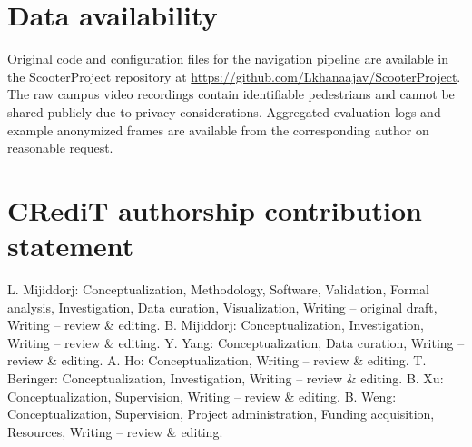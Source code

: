 \documentclass[a4paper,fleqn,10pt]{cas-dc}
\begin{document}
\section*{Data availability}
Original code and configuration files for the navigation pipeline are available in
the ScooterProject repository at
\url{https://github.com/Lkhanaajav/ScooterProject}. The raw campus video
recordings contain identifiable pedestrians and cannot be shared publicly due to
privacy considerations. Aggregated evaluation logs and example anonymized
frames are available from the corresponding author on reasonable request.

\section*{CRediT authorship contribution statement}
L. Mijiddorj: Conceptualization, Methodology, Software, Validation,
Formal analysis, Investigation, Data curation, Visualization,
Writing -- original draft, Writing -- review \& editing.
B. Mijiddorj: Conceptualization, Investigation, Writing -- review \& editing.
Y. Yang: Conceptualization, Data curation, Writing -- review \& editing.
A. Ho: Conceptualization, Writing -- review \& editing.
T. Beringer: Conceptualization, Investigation, Writing -- review \& editing.
B. Xu: Conceptualization, Supervision, Writing -- review \& editing.
B. Weng: Conceptualization, Supervision, Project administration,
Funding acquisition, Resources, Writing -- review \& editing.






\end{document}
